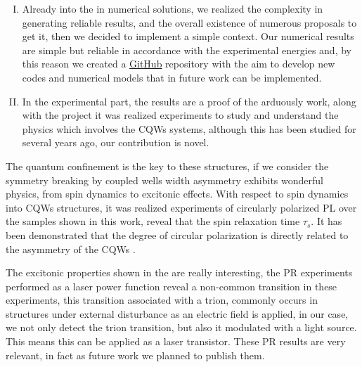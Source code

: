 \begin{enumerate}[I)]
\item Already into the in numerical solutions, we realized the complexity in generating reliable results, and the overall existence of numerous proposals to get it, then we decided to implement a simple context. Our numerical results are simple but reliable in accordance with the experimental energies and, by this reason we created a \href{https://github.com/lflmgroup}{GitHub} repository \cite{lflmgroup} with the aim to develop new codes and numerical models that in future work can be implemented.

\item In the experimental part, the results are a proof of the arduously work,
along with the project it was realized experiments to study and understand the physics
which involves the CQWs systems, although this has been studied for several years ago,
our contribution is novel.
\end{enumerate}


The quantum confinement is the key to these structures, if we consider the symmetry breaking by coupled wells width asymmetry exhibits wonderful physics, from spin dynamics to excitonic effects. With respect to spin dynamics into \gls{CQWs} structures, it was realized
experiments of circularly polarized PL over the samples shown in this work, reveal that the
spin relaxation time $\tau_s$. It has been demonstrated that the degree of circular polarization is directly related to the asymmetry of the \gls{CQWs} \cite{bravo2022photoluminiscence}.

The excitonic properties shown in the  are really interesting, the \gls{PR}
experiments performed as a laser power function reveal a non-common transition in these experiments, this transition associated with a trion, commonly occurs in structures under external disturbance as an electric field is applied, in our case, we not only detect the trion transition, but also it modulated with a light source. This means this can be applied as a laser transistor. These \gls{PR} results are very relevant, in fact as future work we planned
to publish them.

